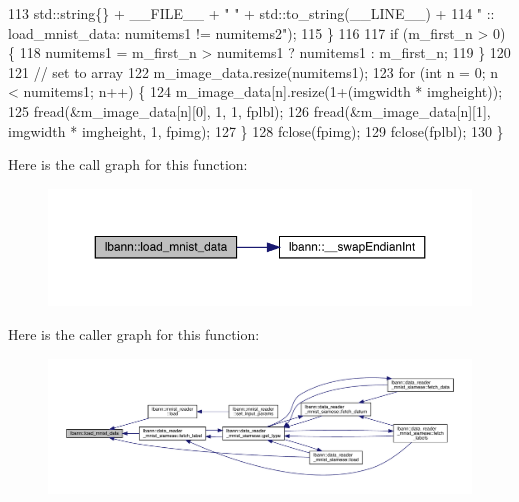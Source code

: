 \begin{DoxyCode}
113       std::string\{\} + \_\_FILE\_\_ + \textcolor{stringliteral}{" "} + std::to\_string(\_\_LINE\_\_) +
114       \textcolor{stringliteral}{" :: load\_mnist\_data: numitems1 != numitems2"});
115   \}
116 
117   \textcolor{keywordflow}{if} (m\_first\_n > 0) \{
118     numitems1 = m\_first\_n > numitems1 ? numitems1 : m\_first\_n;
119   \}
120 
121   \textcolor{comment}{// set to array}
122   m\_image\_data.resize(numitems1);
123   \textcolor{keywordflow}{for} (\textcolor{keywordtype}{int} n = 0; n < numitems1; n++) \{
124     m\_image\_data[n].resize(1+(imgwidth * imgheight));
125     fread(&m\_image\_data[n][0], 1, 1, fplbl);
126     fread(&m\_image\_data[n][1], imgwidth * imgheight, 1, fpimg);
127   \}
128   fclose(fpimg);
129   fclose(fplbl);
130 \}
\end{DoxyCode}
Here is the call graph for this function\+:\nopagebreak
\begin{figure}[H]
\begin{center}
\leavevmode
\includegraphics[width=350pt]{namespacelbann_a59f65281406da5bc57f49d8ec682be2d_cgraph}
\end{center}
\end{figure}
Here is the caller graph for this function\+:\nopagebreak
\begin{figure}[H]
\begin{center}
\leavevmode
\includegraphics[width=350pt]{namespacelbann_a59f65281406da5bc57f49d8ec682be2d_icgraph}
\end{center}
\end{figure}
\mbox{\label{namespacelbann_ab76114a0e8cc90c28bcb9e7d01eec89a}} 
